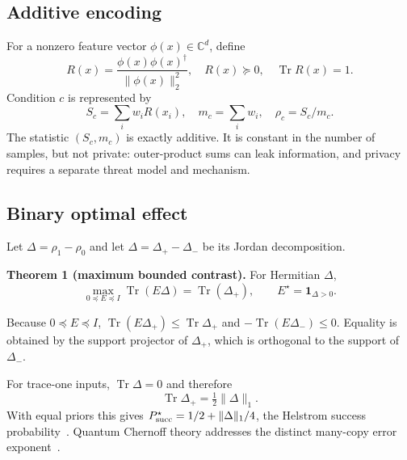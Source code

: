 \documentclass[letterpaper,journal]{IEEEtran}
\newcommand{\Tr}{\operatorname{Tr}}
\newcommand{\C}{\mathbb{C}}
\begin{document}
\subsection{Additive encoding}

For a nonzero feature vector $\phi(x)\in\C^d$, define
\begin{equation}
 R(x)=\frac{\phi(x)\phi(x)^\dagger}{\|\phi(x)\|_2^2},
 \quad R(x)\succeq0,\quad \Tr R(x)=1.                 \label{eq:state}
\end{equation}
Condition $c$ is represented by
\begin{equation}
 S_c=\sum_i w_iR(x_i),\quad m_c=\sum_iw_i,\quad
 \rho_c=S_c/m_c.                                    \label{eq:additive}
\end{equation}
The statistic $(S_c,m_c)$ is exactly additive. It is constant in the number
of samples, but not private: outer-product sums can leak information, and
privacy requires a separate threat model and mechanism.

\subsection{Binary optimal effect}

Let $\Delta=\rho_1-\rho_0$ and let
$\Delta=\Delta_+-\Delta_-$ be its Jordan decomposition.

\textbf{Theorem 1 (maximum bounded contrast).}
For Hermitian $\Delta$,
\begin{equation}
\max_{0\preceq E\preceq I}\Tr(E\Delta)=\Tr(\Delta_+),\qquad
E^\star=\mathbf 1_{\Delta>0}.                       \label{eq:jordan}
\end{equation}

\begin{IEEEproof}
Because $0\preceq E\preceq I$,
$\Tr(E\Delta_+)\leq\Tr\Delta_+$ and
$-\Tr(E\Delta_-)\leq0$. Equality is obtained by the support projector of
$\Delta_+$, which is orthogonal to the support of $\Delta_-$.
\end{IEEEproof}

For trace-one inputs, $\Tr\Delta=0$ and therefore
\begin{equation}
\Tr\Delta_+=\tfrac12\|\Delta\|_1.                   \label{eq:trace}
\end{equation}
With equal priors this gives
$P_{\rm succ}^\star=1/2+\|\Delta\|_1/4$, the Helstrom
success probability~\cite{helstrom1976}. Quantum Chernoff theory addresses
the distinct many-copy error exponent~\cite{audenaert2007}.
\end{document}
